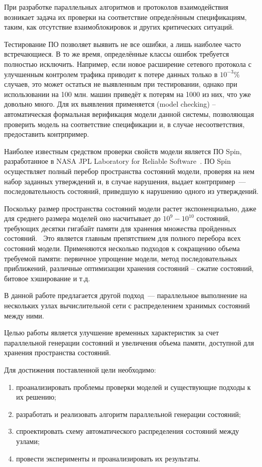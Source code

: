 \Introduction

При разработке параллельных алгоритмов и протоколов взаимодействия возникает задача их
проверки на соответствие определённым спецификациям, таким, как отсутствие
взаимоблокировок и других критических ситуаций.

Тестирование ПО позволяет выявить не все ошибки, а лишь наиболее часто встречающиеся. В то
же время, определённые классы ошибок требуется полностью исключить. Например, если новое
расширение сетевого протокола с улучшенным контролем трафика приводит к потере данных
только в $10^{-3}\%$ случаев, это может остаться не выявленным при тестировании, однако
при использовании на 100 млн. машин приведёт к потерям на 1000 из них, что уже довольно
много. Для их выявления применяется  (model checking) --
автоматическая формальная верификация модели данной системы, позволяющая проверить модель
на соответствие спецификации и, в случае несоответствия, предоставить
контрпример.~\cite{Clarke}

Наиболее известным средством проверки свойств модели является ПО Spin, разработанное в
NASA JPL Laboratory for Reliable Software~\cite{SPIN}. ПО Spin осуществляет полный перебор
пространства состояний модели, проверяя на нем набор заданных утверждений и, в случае
нарушения, выдает контрпример~--- последовательность состояний, приведшую к нарушению
одного из утверждений.

Поскольку размер пространства состояний модели растет экспоненциально, даже для среднего
размера моделей оно насчитывает до $10^9 - 10^{10}$ состояний, требующих десятки гигабайт
памяти для хранения множества пройденных состояний.~\cite{SpinRoot} Это является главным
препятствием для полного перебора всех состояний модели. Применяются несколько подходов к
сокращению объема требуемой памяти: первичное упрощение модели, метод последовательных
приближений, различные оптимизации хранения состояний -- сжатие состояний, битовое
хэширование и т.д.~\cite{Katoen}

В данной работе предлагается другой подход~--- параллельное выполнение на нескольких узлах
вычислительной сети с распределением хранимых состояний между ними.

Целью работы является улучшение временных характеристик за счет параллельной генерации
состояний и увеличения объема памяти, доступной для хранения пространства состояний.

Для достижения поставленной цели необходимо:
\begin{enumerate}
\item проанализировать проблемы проверки моделей и существующие подходы к их решению;
\item разработать и реализовать алгоритм параллельной генерации состояний;
\item спроектировать схему автоматического распределения состояний между узлами;
\item провести эксперименты и проанализировать их результаты.
\end{enumerate}

